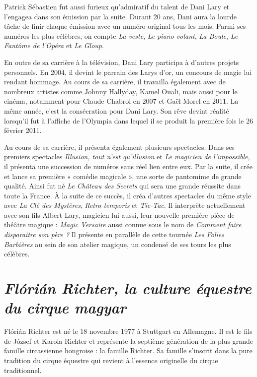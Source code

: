 Patrick Sébastien fut aussi furieux qu’admiratif du talent de Dani Lary et l’engagea dans son émission par la suite. Durant 20 ans, Dani aura la lourde tâche de finir chaque émission avec un numéro original tous les mois. Parmi ses numéros les plus célèbres, on compte \textit{La veste}, \textit{Le piano volant}, \textit{La Boule}, \textit{Le Fantôme de l’Opéra} et \textit{Le Gloup}.

En outre de sa carrière à la télévision, Dani Lary participa à d’autres projets personnels. En 2004, il devint le parrain des Larys d’or, un concours de magie lui rendant hommage. Au cours de sa carrière, il travailla également avec de nombreux artistes comme Johnny Hallyday, Kamel Ouali, mais aussi pour le cinéma, notamment pour Claude Chabrol en 2007 et Gaël Morel en 2011. La même année, c'est la consécration pour Dani Lary. Son rêve devint réalité lorsqu’il fut à l’affiche de l’Olympia dans lequel il se produit la première fois le 26 février 2011.

Au cours de sa carrière, il présenta également plusieurs spectacles. Dans ses premiers spectacles \textit{Illusion, tout n’est qu’illusion} et \textit{Le magicien de l’impossible}, il présenta une succession de numéros sans réel lien entre eux. Par la suite, il crée et lance sa première « comédie magicale », une sorte de pantomime de grande qualité. Ainsi fut né \textit{Le Château des Secrets} qui sera une grande réussite dans toute la France. À la suite de ce succès, il créa d’autres spectacles du même style avec \textit{La Clé des Mystères}, \textit{Retro temporis} et \textit{Tic-Tac}. Il interprète actuellement avec son fils Albert Lary, magicien lui aussi, leur nouvelle première pièce de théâtre magique : \textit{Magic Versaire} aussi connue sous le nom de \textit{Comment faire disparaitre son père ?} Il présente en parallèle de cette tournée \textit{Les Folies Barbières} au sein de son atelier magique, un condensé de ses tours les plus célèbres. 

\section*{\textit{Flórián Richter, la culture équestre du cirque magyar}}
{}

Flórián Richter est né le 18 novembre 1977 à Stuttgart en Allemagne. Il est le fils de József et Karola Richter et représente la septième génération de la plus grande famille circassienne hongroise : la famille Richter. Sa famille s’inscrit dans la pure tradition du cirque équestre qui revient à l’essence originelle du cirque traditionnel. 

